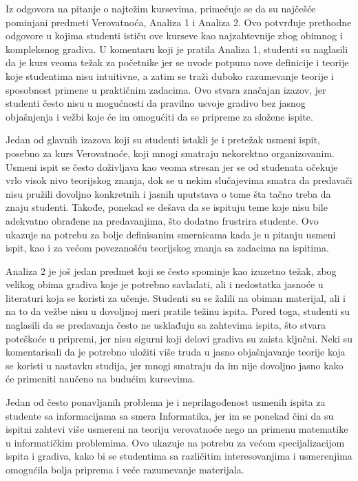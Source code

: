 \documentclass[a4paper]{article}
\begin{document}
Iz odgovora na pitanje o najtežim kursevima, primećuje se da su najčešće pominjani predmeti Verovatnoća, Analiza 1 i Analiza 2. Ovo potvrđuje prethodne odgovore u kojima studenti ističu ove kurseve kao najzahtevnije zbog obimnog i kompleksnog gradiva. U komentaru koji je pratila Analiza 1, studenti su naglasili da je kurs veoma težak za početnike jer se uvode potpuno nove definicije i teorije koje studentima nisu intuitivne, a zatim se traži duboko razumevanje teorije i sposobnost primene u praktičnim zadacima. Ovo stvara značajan izazov, jer studenti često nisu u mogućnosti da pravilno usvoje gradivo bez jasnog objašnjenja i vežbi koje će im omogućiti da se pripreme za složene ispite.

Jedan od glavnih izazova koji su studenti istakli je i pretežak usmeni ispit, posebno za kurs Verovatnoće, koji mnogi smatraju nekorektno organizovanim. Usmeni ispit se često doživljava kao veoma stresan jer se od studenata očekuje vrlo visok nivo teorijskog znanja, dok se u nekim slučajevima smatra da predavači nisu pružili dovoljno konkretnih i jasnih uputstava o tome šta tačno treba da znaju studenti. Takođe, ponekad se dešava da se ispituju teme koje nisu bile adekvatno obrađene na predavanjima, što dodatno frustrira studente. Ovo ukazuje na potrebu za bolje definisanim smernicama kada je u pitanju usmeni ispit, kao i za većom povezanošću teorijskog znanja sa zadacima na ispitima.

Analiza 2 je još jedan predmet koji se često spominje kao izuzetno težak, zbog velikog obima gradiva koje je potrebno savladati, ali i nedostatka jasnoće u literaturi koja se koristi za učenje. Studenti su se žalili na obiman materijal, ali i na to da vežbe nisu u dovoljnoj meri pratile težinu ispita. Pored toga, studenti su naglasili da se predavanja često ne usklađuju sa zahtevima ispita, što stvara poteškoće u pripremi, jer nisu sigurni koji delovi gradiva su zaista ključni. Neki su komentarisali da je potrebno uložiti više truda u jasno objašnjavanje teorije koja se koristi u nastavku studija, jer mnogi smatraju da im nije dovoljno jasno kako će primeniti naučeno na budućim kursevima.

Jedan od često ponavljanih problema je i neprilagođenost usmenih ispita za studente sa informacijama sa smera Informatika, jer im se ponekad čini da su ispitni zahtevi više usmereni na teoriju verovatnoće nego na primenu matematike u informatičkim problemima. Ovo ukazuje na potrebu za većom specijalizacijom ispita i gradiva, kako bi se studentima sa različitim interesovanjima i usmerenjima omogućila bolja priprema i veće razumevanje materijala.
\end{document}
